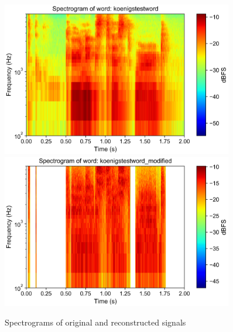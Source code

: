 \documentclass{scrartcl}
\begin{document}
\begin{figure}[p]
	\centering
	\includegraphics[width=0.9\textwidth]{figures/spectrogram_koenigstestword}
	\includegraphics[width=0.9\textwidth]{figures/spectrogram_koenigstestword_modified}
	\caption{Spectrograms of original and reconstructed signals}
	\label{fig:spectrogram}
\end{figure}
\end{document}
